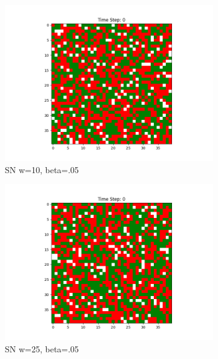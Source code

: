 \documentclass[11pt]{article}
\begin{document}
\begin{figure}[h]
		\begin{subfigure}{0.14\textwidth}
			\includegraphics[width=\linewidth]{initial_cluster_w10b10.png}
			\caption{\centering SN w=10, beta=.05}
		\end{subfigure}\hfill
		\begin{subfigure}{0.14\textwidth}
			\includegraphics[width=\linewidth]{initial_cluster_w20b10.png}
			\caption{\centering SN w=25, beta=.05}
		\end{subfigure}\hfill
		\begin{subfigure}{0.14\textwidth}

\end{subfigure}
\end{figure}
\end{document}
